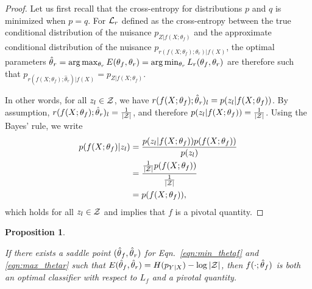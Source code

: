 \documentclass{article}
\theoremstyle{plain}
\newtheorem{proposition}[theorem]{Proposition}
\begin{document}
\begin{proof}

Let us first recall that the cross-entropy for distributions $p$ and $q$ is
minimized when $p=q$. For ${\cal L}_r$ defined as the cross-entropy between the
true conditional distribution of the nuisance $p_{Z|f(X;\theta_f)}$ and
the approximate conditional distribution of the nuisance
$p_{r(f(X;\theta_f);\theta_r)|f(X)}$, the optimal parameters $\smash{\hat\theta}_r =
\arg \max_{\theta_r} E(\theta_f, \theta_r) = \arg \min_{\theta_r} L_r(\theta_f,
\theta_r)$ are therefore such that $p_{r(f(X;\theta_f);\hat\theta_r)|f(X)} = p_{Z|f(X;\theta_f)}$.

In other words, for all $z_l \in {\cal Z}$, we have $r(f(X;\theta_f);\smash{\hat\theta}_r)_l = p(z_l|f(X;\theta_f))$.
By assumption, $r(f(X;\theta_f);\smash{\hat\theta}_r)_l = \frac{1}{|{\cal Z}|}$,
and therefore $p(z_l|f(X;\theta_f)) = \frac{1}{|{\cal Z}|}$.
Using the Bayes' rule, we write
\begin{align*}
    p(f(X;\theta_f)|z_l) &= \frac{ p(z_l|f(X;\theta_f)) p(f(X;\theta_f)) } { p(z_l)} \\
                         &= \frac{ \tfrac{1}{|{\cal Z}|} p(f(X;\theta_f)) } { \tfrac{1}{|{\cal Z}|} } \\
                         &= p(f(X;\theta_f)),
\end{align*}
which holds for all $z_l \in {\cal Z}$ and implies that $f$ is a pivotal quantity.
\end{proof}

\begin{proposition}\label{prop:2}

If there exists a saddle point $(\smash{\hat\theta}_f, \smash{\hat\theta}_r)$
for Eqn.~\ref{eqn:min_thetaf} and \ref{eqn:max_thetar} such that
$E(\hat\theta_f, \hat\theta_r) = H(p_{Y|X}) - \log |{\cal Z}|$, then
$f(\cdot;\smash{\hat\theta}_f)$ is both an optimal classifier with respect to
$L_f$ and a pivotal quantity.

\end{proposition}
\end{document}
